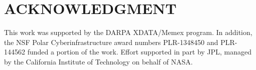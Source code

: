\documentclass[sigconf]{acmart}
\begin{document}


\maketitle




%






\section*{ACKNOWLEDGMENT}
This work was supported by the DARPA XDATA/Memex program. In addition, the NSF Polar Cyberinfrastructure award numbers PLR-1348450 and PLR-144562 funded a portion of the work. Effort supported in part by JPL, managed by the California Institute of Technology on behalf of NASA.


 
\end{document}
